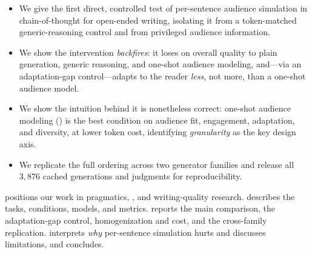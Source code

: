 \begin{itemize}[leftmargin=*,itemsep=0pt,topsep=0pt]
    \item We give the first direct, controlled test of per-sentence audience simulation in
    chain-of-thought for open-ended writing, isolating it from a token-matched generic-reasoning
    control and from privileged audience information.
    \item We show the intervention \emph{backfires}: it loses on overall quality to plain
    generation, generic reasoning, and one-shot audience modeling, and---via an adaptation-gap
    control---adapts to the reader \emph{less}, not more, than a one-shot audience model.
    \item We show the intuition behind it is nonetheless correct: one-shot audience modeling
    (\simtom) is the best condition on audience fit, engagement, adaptation, and diversity, at
    lower token cost, identifying \emph{granularity} as the key design axis.
    \item We replicate the full ordering across two generator families and release all $3{,}876$
    cached generations and judgments for reproducibility.
\end{itemize}

  positions our work in pragmatics, \tom, and
writing-quality research.  describes the tasks, conditions, models, and
metrics.  reports the main comparison, the adaptation-gap control,
homogenization and cost, and the cross-family replication.  interprets
\emph{why} per-sentence simulation hurts and discusses limitations, and 
concludes.
